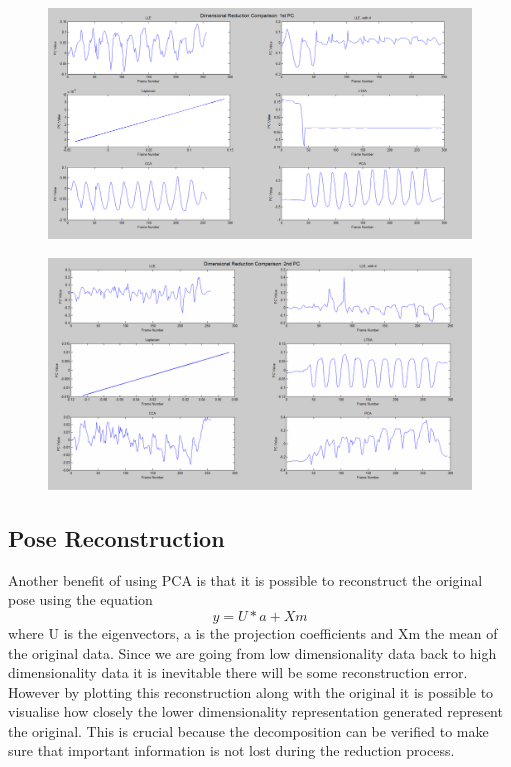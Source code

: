 \begin{figure}[h]
    \centering
    \includegraphics[height=0.25\textheight]{fig04/drcomp.pdf}
    \label{fig:drcomp}
\end{figure}
\clearpage
\begin{figure}[t]
    \centering
    \includegraphics[height=0.25\textheight]{fig04/drcomp2.pdf}
    \label{fig:drcomp}
\end{figure}

\subsection{Pose Reconstruction}
Another benefit of using PCA is that it is possible to reconstruct the original pose using the equation $$y = U*a+Xm$$ where U is the eigenvectors, a is the projection coefficients and Xm the mean of the original data. Since we are going from low dimensionality data back to high dimensionality data it is inevitable there will be some reconstruction error. However by plotting this reconstruction along with the original it is possible to visualise how closely the lower dimensionality representation generated represent the original. This is crucial because the decomposition can be verified to make sure that important information is not lost during the reduction process.\qquad



